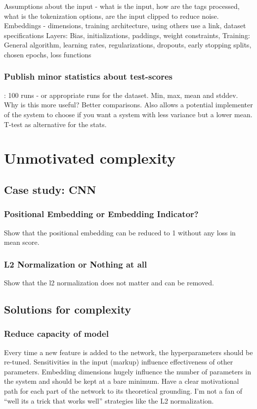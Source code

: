 Assumptions about the input - what is the input, how are the tags processed, what is the tokenization options, are the input clipped to reduce noise.
Embeddings - dimensions, training architecture, using others use a link, dataset specifications
Layers: Bias, initializations, paddings, weight constraints, 
Training: General algorithm, learning rates, regularizations, dropouts, early stopping splits, chosen epochs, loss functions

\subsubsection{Publish minor statistics about test-scores}:
100 runs - or appropriate runs for the dataset. Min, max, mean and stddev. 
Why is this more useful? Better comparisons. Also allows a potential implementer of the system
to choose if you want a system with less variance but a lower mean. 
T-test as alternative for the stats. 


\section{Unmotivated complexity}

\subsection{Case study: CNN}

\subsubsection{Positional Embedding or Embedding Indicator?}
Show that the positional embedding can be reduced to 1 without any loss in mean score. 

\subsubsection{L2 Normalization or Nothing at all}
Show that the l2 normalization does not matter and can be removed.

\subsection{Solutions for complexity}

\subsubsection{Reduce capacity of model}
Every time a new feature is added to the network, the hyperparameters should be re-tuned. Sensitivities in the input (markup) influence effectiveness of other parameters. Embedding dimensions hugely influence the number of parameters in the system and should be kept at a bare minimum. 
Have a clear motivational path for each part of the network to its theoretical grounding. I'm not a fan of ``well its a trick that works well'' strategies like the L2 normalization.

